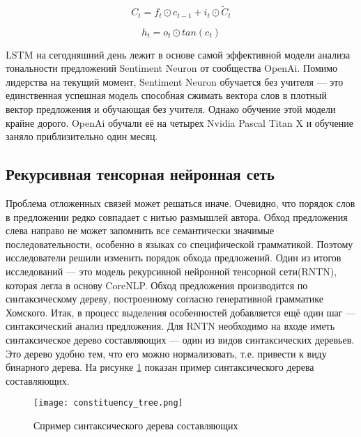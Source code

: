 \begin{equation}
  \label{eq:overview:lstm:new_cell}
  C_t = f_t\odot{c_{t-1}} + i_t\odot{\tilde{C}_t}
\end{equation}

\begin{equation}
  \label{eq:overview:lstm:new_hidden}
  h_t = o_t{\odot}tan(c_t)
\end{equation}

LSTM на сегодняшний день лежит в основе самой эффективной модели анализа тональности предложений Sentiment Neuron от сообщества OpenAi. Помимо лидерства на текущий момент, Sentiment Neuron обучается без учителя --- это единственная успешная модель способная сжимать вектора слов в плотный вектор предложения и обучающая без учителя. Однако обучение этой модели крайне дорого. OpenAi обучали её на четырех Nvidia Pascal Titan X и обучение заняло приблизительно один месяц.

\subsection{Рекурсивная тенсорная нейронная сеть}
Проблема отложенных связей может решаться иначе. Очевидно, что порядок слов в предложении редко совпадает с нитью размышлей автора. Обход предложения слева направо не может запомнить все семантически значимые последовательности, особенно в языках со специфической грамматикой. Поэтому исследователи решили изменить порядок обхода предложений. Один из итогов исследований --- это модель рекурсивной нейронной тенсорной сети(RNTN), которая легла в основу CoreNLP. Обход предложения производится по синтаксическому дереву, построенному согласно генеративной грамматике Хомского.
Итак, в процесс выделения особенностей добавляется ещё один шаг --- синтаксический анализ предложения. Для RNTN необходимо на входе иметь синтаксическое дерево составляющих --- один из видов синтаксических деревьев. Это дерево удобно тем, что его можно нормализовать, т.е. привести к виду бинарного дерева. На рисунке \ref{fig:overview:constituency_tree} показан пример синтаксического дерева составляющих.

\begin{figure}[h]
\centering
  \texttt{[image: constituency\_tree.png]}
  \caption{Спример синтаксического дерева составляющих}\label{fig:overview:constituency_tree}
\end{figure}

